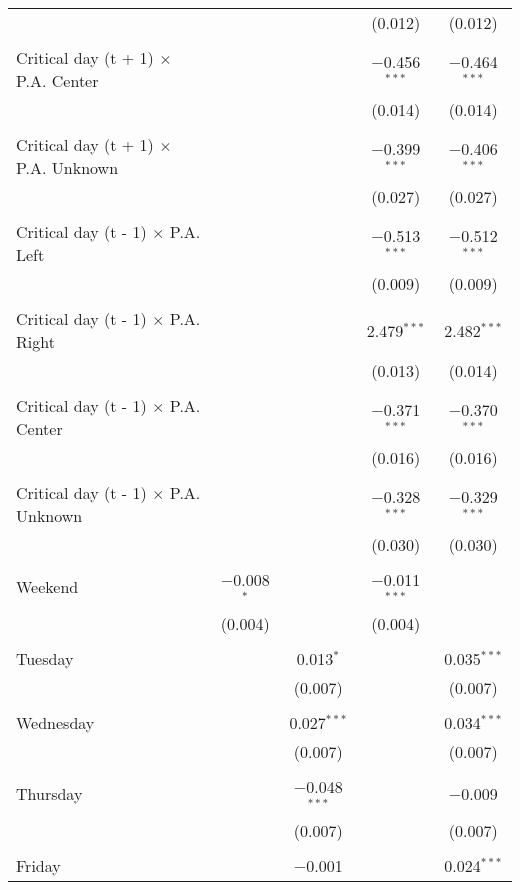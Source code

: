 \documentclass[
]{article}
\begin{document}
\begin{table}[!htbp]
{\begin{tabular}{@{\extracolsep{5pt}}lcccc}
  &  &  & (0.012) & (0.012) \\ 
  & & & & \\ 
 Critical day (t + 1) $\times$ P.A. Center &  &  & $-$0.456$^{***}$ & $-$0.464$^{***}$ \\ 
  &  &  & (0.014) & (0.014) \\ 
  & & & & \\ 
 Critical day (t + 1) $\times$ P.A. Unknown &  &  & $-$0.399$^{***}$ & $-$0.406$^{***}$ \\ 
  &  &  & (0.027) & (0.027) \\ 
  & & & & \\ 
 Critical day (t - 1) $\times$ P.A. Left &  &  & $-$0.513$^{***}$ & $-$0.512$^{***}$ \\ 
  &  &  & (0.009) & (0.009) \\ 
  & & & & \\ 
 Critical day (t - 1) $\times$ P.A. Right &  &  & 2.479$^{***}$ & 2.482$^{***}$ \\ 
  &  &  & (0.013) & (0.014) \\ 
  & & & & \\ 
 Critical day (t - 1) $\times$ P.A. Center &  &  & $-$0.371$^{***}$ & $-$0.370$^{***}$ \\ 
  &  &  & (0.016) & (0.016) \\ 
  & & & & \\ 
 Critical day (t - 1) $\times$ P.A. Unknown &  &  & $-$0.328$^{***}$ & $-$0.329$^{***}$ \\ 
  &  &  & (0.030) & (0.030) \\ 
  & & & & \\ 
 Weekend & $-$0.008$^{*}$ &  & $-$0.011$^{***}$ &  \\ 
  & (0.004) &  & (0.004) &  \\ 
  & & & & \\ 
 Tuesday &  & 0.013$^{*}$ &  & 0.035$^{***}$ \\ 
  &  & (0.007) &  & (0.007) \\ 
  & & & & \\ 
 Wednesday &  & 0.027$^{***}$ &  & 0.034$^{***}$ \\ 
  &  & (0.007) &  & (0.007) \\ 
  & & & & \\ 
 Thursday &  & $-$0.048$^{***}$ &  & $-$0.009 \\ 
  &  & (0.007) &  & (0.007) \\ 
  & & & & \\ 
 Friday &  & $-$0.001 &  & 0.024$^{***}$ \\ 

\end{tabular}}
\end{table}
\end{document}
